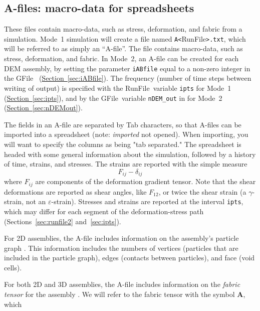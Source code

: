 \documentclass[letterpaper,11pt]{article}
\newcommand{\RunFile}{\textsf{RunFile}}
\newcommand{\GFile}{\textsf{GFile}}
\begin{document}
\subsection{A-files: macro-data for spreadsheets}\label{sec:Afiles}
These files contain macro-data, such as stress,
deformation, and fabric from a simulation.
Mode~1 simulation will create a file named 
\texttt{A<}\textsf{RunFile}\texttt{>.txt}, which 
will be referred to as simply an ``A-file''.
The file contains macro-data, such as stress,
deformation, and fabric.
In Mode~2, an A-file can be created for each DEM assembly,
by setting the parameter \texttt{iABfile} equal to a non-zero
integer in the \GFile\ %
(\hyperref[sec:iABfile]{Section~\ref*{sec:iABfile}}).
The frequency (number of time steps between writing of output)
is specified with the \RunFile\ variable
\texttt{ipts} for Mode~1
(\hyperref[sec:ipts]{Section~\ref*{sec:ipts}}),
and by the \GFile\ variable \texttt{nDEM\_out} in
for Mode~2
(\hyperref[sec:nDEMout]{Section~\ref*{sec:nDEMout}}).
%
\par
The fields in an A-file are separated by Tab characters, 
so that A-files can
be imported into a spreadsheet (note: \emph{imported} not opened).
When importing, you will want to specify the columns as being "tab separated."
The spreadsheet is headed with some general information about the simulation,
followed by a history of time, strains, and stresses.
The strains are reported with the simple measure
%
\begin{equation}\label{eq:strain}
F_{ij} - \delta_{ij}
\end{equation}
%
where $F_{ij}$ are components of the deformation gradient tensor.
Note that the shear deformations are reported as shear angles,
like $F_{12}$, or 
twice the shear strain (a $\gamma$-strain, not an $\varepsilon$-strain).
Stresses and strains are reported at the interval
\texttt{ipts},
which may differ for each segment
of the deformation-stress path 
(Sections~\hyperref[sec:runfile2]{\ref*{sec:runfile2}}
and~\hyperref[sec:ipts]{\ref*{sec:ipts}}).
%
\par
For 2D assemblies, the A-file includes information on the assembly's
particle graph \citep{Satake:1992a,Satake:1993b,Kuhn:1999a}.
This information includes the numbers of vertices (particles that are included
in the particle graph), edges (contacts between particles),
and face (void cells).
\par
For both 2D and 3D assemblies, the A-file includes information on
the \emph{fabric tensor} for the assembly \citep{Satake:1982a}.
We will refer to the fabric tensor with the symbol $\mathbf{A}$, which
\end{document}
